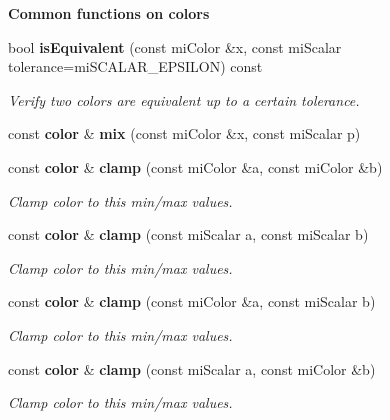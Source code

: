 \begin{Indent}{\bf Common functions on colors}\par
\begin{CompactItemize}
\item 
bool {\bf is\-Equivalent} (const mi\-Color \&x, const mi\-Scalar tolerance=mi\-SCALAR\_\-EPSILON) const 
\begin{CompactList}\small\item\em Verify two colors are equivalent up to a certain tolerance. \item\end{CompactList}\item 
const {\bf color} \& {\bf mix} (const mi\-Color \&x, const mi\-Scalar p)
\item 
const {\bf color} \& {\bf clamp} (const mi\-Color \&a, const mi\-Color \&b)
\begin{CompactList}\small\item\em Clamp color to this min/max values. \item\end{CompactList}\item 
const {\bf color} \& {\bf clamp} (const mi\-Scalar a, const mi\-Scalar b)
\begin{CompactList}\small\item\em Clamp color to this min/max values. \item\end{CompactList}\item 
const {\bf color} \& {\bf clamp} (const mi\-Color \&a, const mi\-Scalar b)
\begin{CompactList}\small\item\em Clamp color to this min/max values. \item\end{CompactList}\item 
const {\bf color} \& {\bf clamp} (const mi\-Scalar a, const mi\-Color \&b)
\begin{CompactList}\small\item\em Clamp color to this min/max values. \item\end{CompactList}\end{CompactItemize}
\end{Indent}
